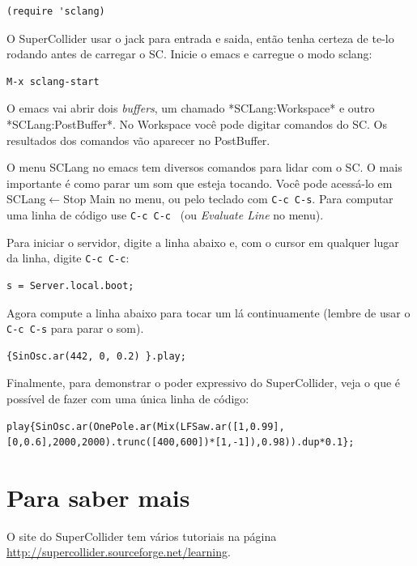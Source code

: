 \documentclass[12pt,brazil]{book}
\begin{document}
\begin{verbatim}
(require 'sclang)
\end{verbatim}

O SuperCollider usar o jack para entrada e saida, então tenha certeza
de te-lo rodando antes de carregar o SC. Inicie o emacs e carregue o
modo sclang:

\begin{verbatim}
M-x sclang-start
\end{verbatim}

O emacs vai abrir dois \textit{buffers}, um chamado *SCLang:Workspace*
e outro *SCLang:PostBuffer*. No Workspace você pode digitar comandos
do SC. Os resultados dos comandos vão aparecer no PostBuffer.

O menu SCLang no emacs tem diversos comandos para lidar com o SC. O
mais importante é como parar um som que esteja tocando. Você pode
acessá-lo em SCLang$\leftarrow$Stop Main no menu, ou pelo teclado com
\texttt{C-c C-s}. Para computar uma linha de código use \texttt{C-c
  C-c } (ou \textit{Evaluate Line} no menu).

Para iniciar o servidor, digite a linha abaixo e, com o cursor em
qualquer lugar da linha, digite \texttt{C-c C-c}:

\begin{verbatim}
s = Server.local.boot;
\end{verbatim}

Agora compute a linha abaixo para tocar um lá continuamente (lembre de
usar o \texttt{C-c C-s} para parar o som).

\begin{verbatim}
{SinOsc.ar(442, 0, 0.2) }.play;
\end{verbatim}

Finalmente, para demonstrar o poder expressivo do SuperCollider, veja
o que é possível de fazer com uma única linha de código:

\begin{verbatim}
play{SinOsc.ar(OnePole.ar(Mix(LFSaw.ar([1,0.99],[0,0.6],2000,2000).trunc([400,600])*[1,-1]),0.98)).dup*0.1};
\end{verbatim}

\section{Para saber mais}
\label{sec:para-saber-mais-1}

O site do SuperCollider tem vários tutoriais na página
\url{http://supercollider.sourceforge.net/learning}.
\end{document}
